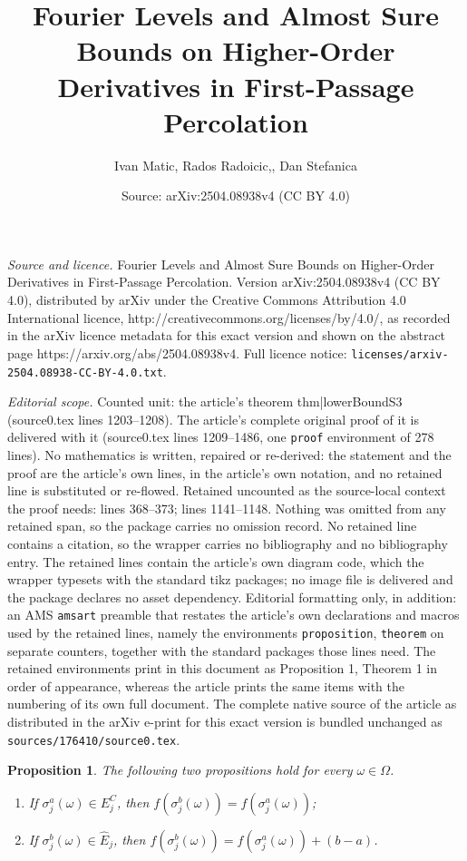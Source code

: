 \documentclass[10pt,a4paper]{amsart}
\title{Fourier Levels and Almost Sure Bounds on Higher-Order Derivatives in First-Passage Percolation}
\author{Ivan Matic, Rados Radoicic,, Dan Stefanica}
\date{Source: arXiv:2504.08938v4 (CC BY 4.0)}
\newtheorem{proposition}{Proposition}
\begin{document}
\maketitle

\noindent\emph{Source and licence.} Fourier Levels and Almost Sure Bounds on Higher-Order Derivatives in First-Passage Percolation. Version arXiv:2504.08938v4 (CC BY 4.0), distributed by arXiv under the Creative Commons Attribution 4.0 International licence, http://creativecommons.org/licenses/by/4.0/, as recorded in the arXiv licence metadata for this exact version and shown on the abstract page https://arxiv.org/abs/2504.08938v4. Full licence notice: \texttt{licenses/arxiv-2504.08938-CC-BY-4.0.txt}.\par\smallskip

\noindent\textit{Editorial scope.} Counted unit: the article's theorem thm|lowerBoundS3 (source0.tex lines 1203--1208). The article's complete original proof of it is delivered with it (source0.tex lines 1209--1486, one \texttt{proof} environment of 278 lines). No mathematics is written, repaired or re-derived: the statement and the proof are the article's own lines, in the article's own notation, and no retained line is substituted or re-flowed.  Retained uncounted as the source-local context the proof needs: lines 368--373; lines 1141--1148.  Nothing was omitted from any retained span, so the package carries no omission record.  No retained line contains a citation, so the wrapper carries no bibliography and no bibliography entry.  The retained lines contain the article's own diagram code, which the wrapper typesets with the standard tikz packages; no image file is delivered and the package declares no asset dependency.  Editorial formatting only, in addition: an AMS \texttt{amsart} preamble that restates the article's own declarations and macros used by the retained lines, namely the environments \texttt{proposition}, \texttt{theorem} on separate counters, together with the standard packages those lines need.  The retained environments print in this document as Proposition 1, Theorem 1 in order of appearance, whereas the article prints the same items with the numbering of its own full document.  The complete native source of the article as distributed in the arXiv e-print for this exact version is bundled unchanged as \texttt{sources/176410/source0.tex}.
\begin{proposition}\label{thm|forComputer} The following two propositions hold for every $\omega\in\Omega$.
\begin{enumerate}
\item[(a)] If $\sigma_j^a(\omega)\in E_j^C$, then $f(\sigma_j^b(\omega))=f(\sigma_j^a(\omega))$;
\item[(b)] If $\sigma_j^b(\omega)\in \hat E_j$, then $f(\sigma_j^b(\omega))=f(\sigma_j^a(\omega))+(b-a)$.
\end{enumerate}
\end{proposition} 
\end{document}
